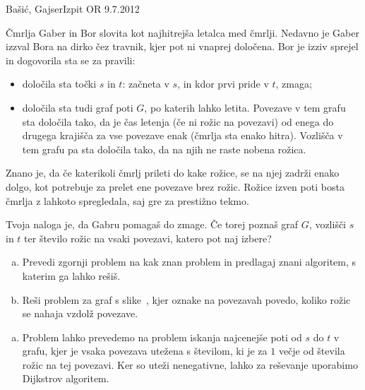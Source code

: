 \begin{naloga}{Bašić, Gajser}{Izpit OR 9.7.2012}
\begin{vprasanje}
Čmrlja Gaber in Bor slovita kot najhitrejša letalca med čmrlji.
Nedavno je Gaber izzval Bora na dirko čez travnik,
kjer pot ni vnaprej določena.
Bor je izziv sprejel in dogovorila sta se za pravili:
\begin{itemize}
\item določila sta točki $s$ in $t$:
začneta v $s$, in kdor prvi pride v $t$, zmaga;
\item določila sta tudi graf poti $G$, po katerih lahko letita.
Povezave v tem grafu sta določila tako,
da je čas letenja (če ni rožic na povezavi)
od enega do drugega krajišča za vse povezave enak (čmrlja sta enako hitra).
Vozlišča v tem grafu pa sta določila tako, da na njih ne raste nobena rožica.
\end{itemize}
Znano je, da če katerikoli čmrlj prileti do kake rožice,
se na njej zadrži enako dolgo,
kot potrebuje za prelet ene povezave brez rožic.
Rožice izven poti bosta čmrlja z lahkoto spregledala,
saj gre za prestižno tekmo.

Tvoja naloga je, da Gabru pomagaš do zmage.
Če torej poznaš graf $G$, vozlišči $s$ in $t$
ter število rožic na vsaki povezavi, katero pot naj izbere?

\begin{enumerate}[(a)]
\item Prevedi zgornji problem na kak znan problem
in predlagaj znani algoritem, s katerim ga lahko rešiš.

\item Reši problem za graf s slike~\fig,
kjer oznake na povezavah povedo, koliko rožic se nahaja vzdolž povezave.
\end{enumerate}

\begin{slika}
\pgfslika
{}
\end{slika}
\end{vprasanje}

\begin{odgovor}
\begin{enumerate}[(a)]
\item Problem lahko prevedemo
na problem iskanja najcenejše poti od $s$ do $t$ v grafu,
kjer je vsaka povezava utežena s številom,
ki je za $1$ večje od števila rožic na tej povezavi.
Ker so uteži nenegativne, lahko za reševanje uporabimo Dijkstrov algoritem.


\end{enumerate}
\end{odgovor}
\end{naloga}
